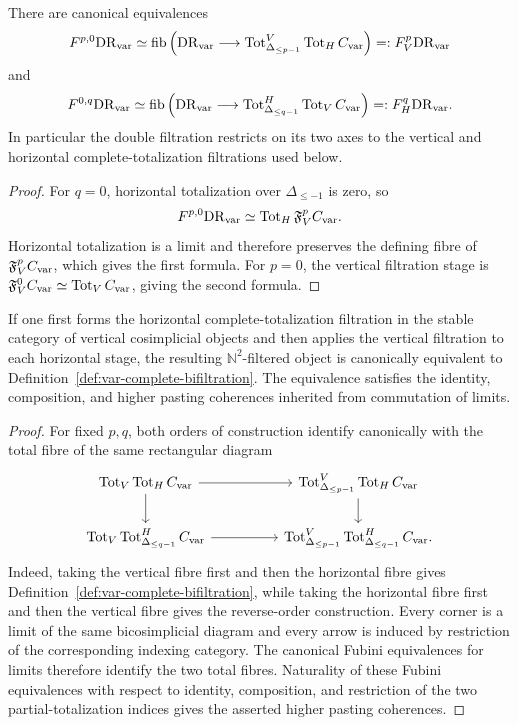 \begin{proposition}
\label{prop:var-bifiltration-edges}
There are canonical equivalences
\[
    F^{p,0}\mathrm{DR}_{\mathrm{var}}
    \simeq
    \operatorname{fib}\left(
      \mathrm{DR}_{\mathrm{var}}\longrightarrow
      \operatorname{Tot}^V_{\Delta_{\le p-1}}\operatorname{Tot}_HC_{\mathrm{var}}
    \right)
    =:F_V^p\mathrm{DR}_{\mathrm{var}}
\]
and
\[
    F^{0,q}\mathrm{DR}_{\mathrm{var}}
    \simeq
    \operatorname{fib}\left(
      \mathrm{DR}_{\mathrm{var}}\longrightarrow
      \operatorname{Tot}^H_{\Delta_{\le q-1}}\operatorname{Tot}_VC_{\mathrm{var}}
    \right)
    =:F_H^q\mathrm{DR}_{\mathrm{var}}.
\]
In particular the double filtration restricts on its two axes to the vertical and horizontal complete-totalization filtrations used below.
\end{proposition}

\begin{proof}
For \(q=0\), horizontal totalization over \(\Delta_{\le-1}\) is zero, so
\[
    F^{p,0}\mathrm{DR}_{\mathrm{var}}\simeq\operatorname{Tot}_H\mathfrak F_V^pC_{\mathrm{var}}.
\]
Horizontal totalization is a limit and therefore preserves the defining fibre of \(\mathfrak F_V^pC_{\mathrm{var}}\), which gives the first formula. For \(p=0\), the vertical filtration stage is \(\mathfrak F_V^0C_{\mathrm{var}}\simeq\operatorname{Tot}_VC_{\mathrm{var}}\), giving the second formula.
\end{proof}

\begin{proposition}
\label{prop:var-bifiltration-symmetry}
If one first forms the horizontal complete-totalization filtration in the stable category of vertical cosimplicial objects and then applies the vertical filtration to each horizontal stage, the resulting \(\mathbb N^2\)-filtered object is canonically equivalent to Definition~\ref{def:var-complete-bifiltration}. The equivalence satisfies the identity, composition, and higher pasting coherences inherited from commutation of limits.
\end{proposition}

\begin{proof}
For fixed \(p,q\), both orders of construction identify canonically with the total fibre of the same rectangular diagram
\[
\begin{tikzcd}[column sep=huge]
\Tot_V\Tot_H\Cvar
  \arrow[r]
  \arrow[d]
&
\Tot^V_{\Delta_{\le p-1}}\Tot_H\Cvar
  \arrow[d]
\\
\Tot_V\Tot^H_{\Delta_{\le q-1}}\Cvar
  \arrow[r]
&
\Tot^V_{\Delta_{\le p-1}}
\Tot^H_{\Delta_{\le q-1}}\Cvar .
\end{tikzcd}
\]
Indeed, taking the vertical fibre first and then the horizontal fibre gives Definition~\ref{def:var-complete-bifiltration}, while taking the horizontal fibre first and then the vertical fibre gives the reverse-order construction. Every corner is a limit of the same bicosimplicial diagram and every arrow is induced by restriction of the corresponding indexing category. The canonical Fubini equivalences for limits therefore identify the two total fibres. Naturality of these Fubini equivalences with respect to identity, composition, and restriction of the two partial-totalization indices gives the asserted higher pasting coherences.
\end{proof}

